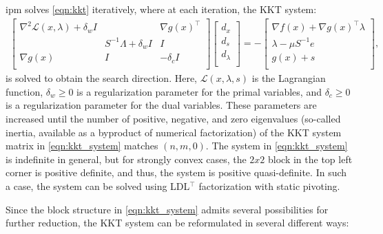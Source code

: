 \documentclass{article}
\begin{document}
\Gls*{ipm} solves \cref{eqn:kkt} iteratively, where at each iteration, the KKT system:
\begin{align}\label{eqn:kkt_system}
  \begin{bmatrix}
    \nabla^2 \mathcal{L}(x,\lambda) + \delta_w I&  & \nabla g(x)^\top \\
     & S^{-1}\Lambda + \delta_w I& I\\
    \nabla g(x) & I & - \delta_c I\\
  \end{bmatrix}
  \begin{bmatrix}
    d_x\\
    d_s\\
    d_\lambda\\
  \end{bmatrix} =
  -\begin{bmatrix}
    \nabla f(x) + \nabla g(x)^\top \lambda\\
    \lambda - \mu S^{-1} e\\
    g(x) + s\\
  \end{bmatrix},
\end{align}
is solved to obtain the search direction. Here, $\mathcal{L}(x,\lambda,s)$ is the Lagrangian function, $\delta_w\geq 0$ is a regularization parameter for the primal variables, and $\delta_c\geq 0$ is a regularization parameter for the dual variables.
These parameters are increased until the number of positive, negative, and zero eigenvalues (so-called inertia, available as a byproduct of numerical factorization) of the KKT system matrix in \eqref{eqn:kkt_system} matches $(n, m, 0)$.
The system in \eqref{eqn:kkt_system} is indefinite in general, but for strongly convex cases, the $2x2$ block in the top left corner is positive definite, and thus, the system is positive quasi-definite. In such a case, the system can be solved using LDL$^\top$ factorization with static pivoting.

Since the block structure in \cref{eqn:kkt_system} admits several possibilities for further reduction, the KKT system can be reformulated in several different ways:
\end{document}
